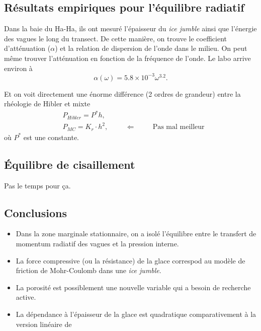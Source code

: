 \documentclass[10pt]{article}
\numberwithin{equation}{section}
\begin{document}
\subsection{Résultats empiriques pour l'équilibre radiatif}
\label{sec:org3071eaa}

Dans la baie du Ha-Ha, ils ont mesuré l'épaisseur du \emph{ice jumble} ainsi que l'énergie des vagues le long du transect.
De cette manière, on trouve le coefficient d'atténuation (\(\alpha\))  et la relation de dispersion de l'onde dans le milieu.
On peut même trouver l'atténuation en fonction de la fréquence de l'onde.
Le labo arrive environ à
\begin{equation}
   \alpha(\omega)  = 5.8 \times 10^{-3} \omega^{3.2}.
\end{equation}

Et on voit directement une énorme différence (2 ordres de grandeur) entre la rhéologie de Hibler et mixte
\begin{align}
   &P_{Hibler} = P^* h,\\
   &P_{MC} = K_r \cdot h^2, \hspace{1cm}\Leftarrow\hspace{1cm}\text{Pas mal meilleur}
\end{align}
où \(P^*\) est une constante.

\subsection{Équilibre de cisaillement}
\label{sec:org71928e4}

Pas le temps pour ça.

\subsection{Conclusions}
\label{sec:org125c932}

\begin{itemize}
\item Dans la zone marginale stationnaire, on a isolé l'équilibre entre le transfert de momentum radiatif des vagues et la pression interne.
\item La force compressive (ou la résistance) de la glace correspod au modèle de friction de Mohr-Coulomb dans une \emph{ice jumble}.
\item La porosité est possiblement une nouvelle variable qui a besoin de recherche active.
\item La dépendance à l'épaisseur de la glace est quadratique comparativement à la version linéaire de \Textcite{hibler1979dynamic}
\end{itemize}
\end{document}
